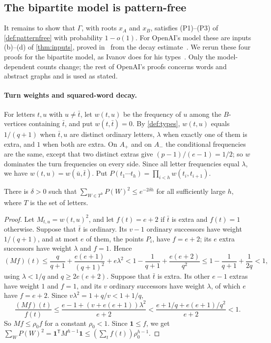 \documentclass[11pt]{article}
\theoremstyle{definition}
\theoremstyle{plain}
\newcommand{\one}{\mathbf{1}}
\begin{document}
\subsection{The bipartite model is pattern-free}\label{sec:zdtransfer}

It remains to show that $\Gamma$, with roots $x_A$ and $x_B$, satisfies (P1)--(P3) of \cref{def:patternfree} with probability $1-o(1)$. For OpenAI's model these are inputs (b)--(d) of \cref{thm:inputs}, proved in~\cite[Lemmas~2.2, 2.3 and Prop.~3.1]{OAI196} from the decay estimate~\cite[Lemma~2.1]{OAI196}. We rerun these four proofs for the bipartite model, as Ivanov does for his types~\cite[Lemmas~4.2 and~4.4, Props.~5.3 and~6.1]{Ivanov2026}. Only the model-dependent counts change; the rest of OpenAI's proofs concerns words and abstract graphs and is used as stated.

\paragraph{Turn weights and squared-word decay.}
For letters $t,u$ with $u\neq\bar t$, let $w(t,u)$ be the frequency of $u$ among the $B$-vertices containing $\bar t$, and put $w(t,\bar t)=0$. By \cref{def:types}, $w(t,u)$ equals $1/(q+1)$ when $\bar t,u$ are distinct ordinary letters, $\lambda$ when exactly one of them is extra, and $1$ when both are extra. On $A_+$ and on $A_-$ the conditional frequencies are the same, except that two distinct extras give $(p-1)/(e-1)=1/2$; so $w$ dominates the turn frequencies on every side. Since all letter frequencies equal $\lambda$, we have $w(t,u)=w(\bar u,\bar t)$. Put $P(t_1\cdots t_h)=\prod_{i<h}w(t_i,t_{i+1})$.

\begin{lemma}\label{lem:decay}
There is $\delta>0$ such that $\sum_{W\in T^h}P(W)^2\le e^{-2\delta h}$ for all sufficiently large $h$, where $T$ is the set of letters.
\end{lemma}

\begin{proof}
Let $M_{t,u}=w(t,u)^2$, and let $f(t)=e+2$ if $\bar t$ is extra and $f(t)=1$ otherwise. Suppose that $\bar t$ is ordinary. Its $v-1$ ordinary successors have weight $1/(q+1)$, and at most $e$ of them, the points $P_i$, have $f=e+2$; its $e$ extra successors have weight $\lambda$ and $f=1$. Hence
\[
(Mf)(t)\le\frac{q}{q+1}+\frac{e(e+1)}{(q+1)^2}+e\lambda^2<1-\frac1{q+1}+\frac{e(e+2)}{q^2}\le1-\frac1{q+1}+\frac1{2q}<1,
\]
using $\lambda<1/q$ and $q\ge2e(e+2)$. Suppose that $\bar t$ is extra. Its other $e-1$ extras have weight $1$ and $f=1$, and its $v$ ordinary successors have weight $\lambda$, of which $e$ have $f=e+2$. Since $v\lambda^2=1+q/v<1+1/q$,
\[
\frac{(Mf)(t)}{f(t)}\le\frac{e-1+(v+e(e+1))\lambda^2}{e+2}<\frac{e+1/q+e(e+1)/q^2}{e+2}<1.
\]
So $Mf\le\rho_0f$ for a constant $\rho_0<1$. Since $\one\le f$, we get $\sum_WP(W)^2=\one^{\mathsf T}M^{h-1}\one\le(\sum_tf(t))\rho_0^{h-1}$.
\end{proof}
\end{document}
